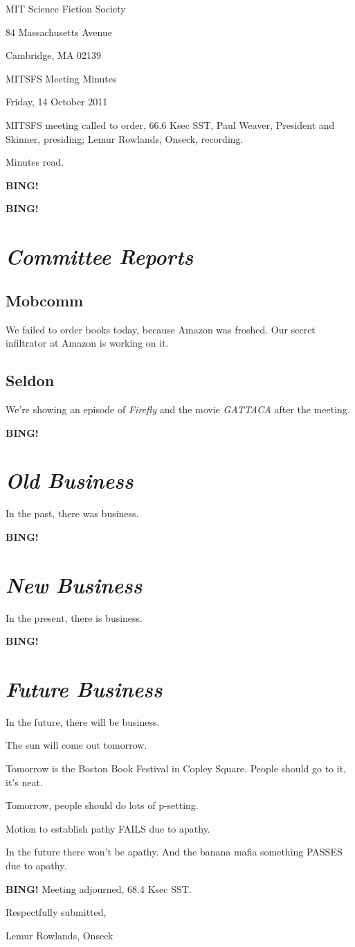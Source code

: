 \documentclass[10pt]{article}
\newcommand{\bing}{{\bf BING!} }
\newcommand{\goto}[1]{\bing \vskip 12pt \section*{{\em{#1}}}}
\newcommand{\skinner}{Paul Weaver, President and Skinner}
\newcommand{\onseck}{Lemur Rowlands, Onseck}
\newcommand{\meetingdate}{Friday, 14 October 2011}
\begin{document}
\begin{center}

MIT Science Fiction Society

84 Massachusetts Avenue

Cambridge, MA 02139

\vspace{12pt}

MITSFS Meeting Minutes

\meetingdate

\end{center}

\vspace{18pt}

\setlength{\parskip}{6pt}

\noindent
MITSFS meeting called to order, 66.6 Ksec SST,
\skinner, presiding; \onseck, recording.

Minutes read.

\bing

\goto{Committee Reports}

\subsection*{Mobcomm}

We failed to order books today, because Amazon was froshed.  Our
secret infiltrator at Amazon is working on it.

\subsection*{Seldon}

We're showing an episode of \emph{Firefly} and the movie \emph{GATTACA}
after the meeting.

\goto{Old Business}

In the past, there was business.

\goto{New Business}

In the present, there is business.

\goto{Future Business}

In the future, there will be business.

The sun will come out tomorrow.

Tomorrow is the Boston Book Festival in Copley Square.  People should
go to it, it's neat.

Tomorrow, people should do lots of p-setting.

Motion to establish pathy FAILS due to apathy.

In the future there won't be apathy.  And the banana 
mafia something PASSES due to apathy.

\bing
\noindent
Meeting adjourned, 68.4 Ksec SST.

\vspace{18pt}

\centerline{Respectfully submitted,}
\centerline{\onseck}
\end{document}
